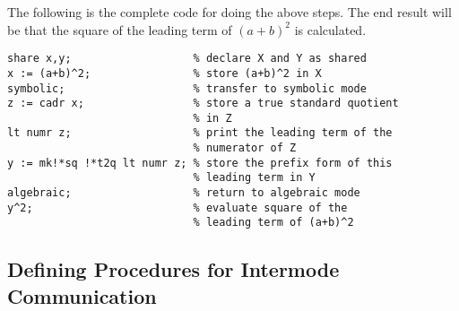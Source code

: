 The following is the complete code for doing the above steps. The end
result will be that the square of the leading term of $(a+b)^{2}$ is
calculated.

\begin{verbatim}
share x,y;                   % declare X and Y as shared
x := (a+b)^2;                % store (a+b)^2 in X
symbolic;                    % transfer to symbolic mode
z := cadr x;                 % store a true standard quotient
                             % in Z
lt numr z;                   % print the leading term of the
                             % numerator of Z
y := mk!*sq !*t2q lt numr z; % store the prefix form of this
                             % leading term in Y
algebraic;                   % return to algebraic mode
y^2;                         % evaluate square of the
                             % leading term of (a+b)^2
\end{verbatim}

\subsection{Defining Procedures for Intermode Communication}

